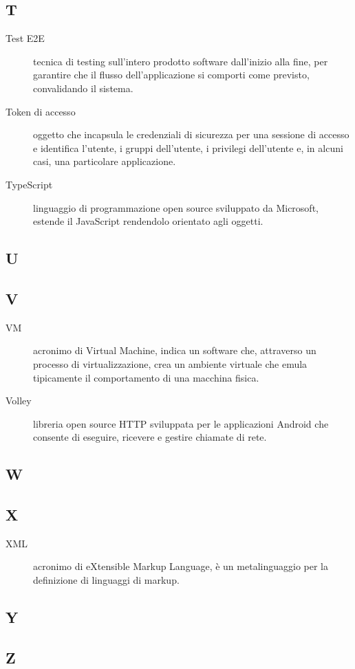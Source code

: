 \documentclass[../manuale-manutentore.tex]{subfiles}
\begin{document}
\subsection{T}

\begin{description}
    \item[Test E2E] tecnica di testing sull'intero prodotto software dall'inizio alla fine, per garantire che il flusso dell'applicazione si comporti come previsto, convalidando il sistema.
    \item[Token di accesso] oggetto che incapsula le credenziali di sicurezza per una sessione di accesso e identifica l'utente, i gruppi dell'utente, i privilegi dell'utente e, in alcuni casi, una particolare applicazione.
    \item[TypeScript] linguaggio di programmazione open source sviluppato da Microsoft, estende il JavaScript rendendolo orientato agli oggetti.
\end{description}

\subsection{U}

\subsection{V}

\begin{description}
    \item[VM] acronimo di Virtual Machine, indica un software che, attraverso un processo di virtualizzazione, crea un ambiente virtuale che emula tipicamente il comportamento di una macchina fisica.
    \item[Volley] libreria open source HTTP sviluppata per le applicazioni Android che consente di eseguire, ricevere e gestire chiamate di rete.
\end{description}

\subsection{W}

\subsection{X}
\begin{description}
    \item[XML] acronimo di eXtensible Markup Language, è un metalinguaggio per la definizione di linguaggi di markup.
\end{description}

\subsection{Y}

\subsection{Z}
\end{document}

